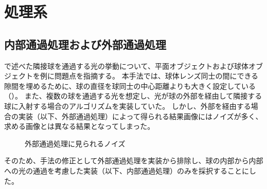 \section{処理系}
\label{S}

\subsection{内部通過処理および外部通過処理}
\label{SSInnerOuterProcess}

で述べた隣接球を通過する光の挙動について、平面オブジェクトおよび球体オブジェクトを例に問題点を指摘する。
本手法では、球体レンズ同士の間にできる隙間を埋めるために、球の直径を球同士の中心距離よりも大きく設定している（）。
また、複数の球を通過する光を想定し、光が球の外部を経由して隣接する球に入射する場合のアルゴリズムを実装していた。
しかし、外部を経由する場合の実装（以下、外部通過処理）によって得られる結果画像にはノイズが多く、求める画像とは異なる結果となってしまった。
\begin{figure}[htbp]
  \centering
{}
  \caption{外部通過処理に見られるノイズ}
  \label{FNoise}
\end{figure}
そのため、手法の修正として外部通過処理を実装から排除し、球の内部から内部への光の通過を考慮した実装（以下、内部通過処理）のみを採択することにした。

